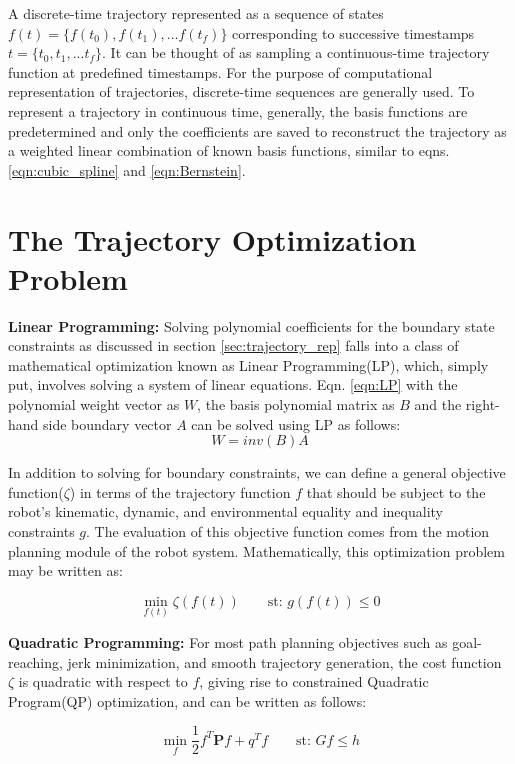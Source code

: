 A discrete-time trajectory represented as a sequence of states $f(t) = \{f(t_0), f(t_1), ... f(t_f)\}$ corresponding to successive timestamps $t = \{t_0, t_1, ... t_f\}$. It can be thought of as sampling a continuous-time trajectory function at predefined timestamps. For the purpose of computational representation of trajectories, discrete-time sequences are generally used. To represent a trajectory in continuous time, generally, the basis functions are predetermined and only the coefficients are saved to reconstruct the trajectory as a weighted linear combination of known basis functions, similar to eqns. \ref{eqn:cubic_spline} and \ref{eqn:Bernstein}.


\section{The Trajectory Optimization Problem}
\label{sec:optimization-intro}
\textbf{Linear Programming:}
Solving polynomial coefficients for the boundary state constraints as discussed in section \ref{sec:trajectory_rep} falls into a class of mathematical optimization known as Linear Programming(LP), which, simply put, involves solving a system of linear equations. Eqn. \ref{eqn:LP} with the polynomial weight vector as $W$, the basis polynomial matrix as $B$ and the right-hand side boundary vector $A$ can be solved using LP as follows:
\begin{equation}
    W = inv({B})A
\end{equation}

In addition to solving for boundary constraints, we can define a general objective function($\zeta$) in terms of the trajectory function $f$ that should be subject to the robot's kinematic, dynamic, and environmental equality and inequality constraints $g$. The evaluation of this objective function comes from the motion planning module of the robot system. Mathematically, this optimization problem may be written as:

\begin{equation}
\min_{f(t)} \zeta(f(t)) \qquad \text{st: } g(f(t)) \leq 0
\end{equation}


\textbf{Quadratic Programming:}
For most path planning objectives such as goal-reaching, jerk minimization, and smooth trajectory generation, the cost function $\zeta$ is quadratic with respect to $f$, giving rise to constrained Quadratic Program(QP) optimization, and can be written as follows:


\begin{equation}
\min_{f} \frac{1}{2}f^{T}\boldsymbol{P}f + q^{T}f \qquad
 \text{st: }  Gf \leq h\label{eqn:QP}
\end{equation}

